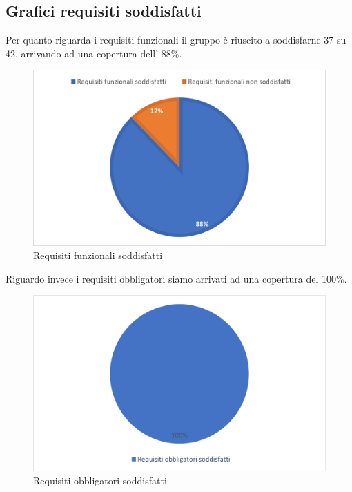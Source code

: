 \subsection{Grafici requisiti soddisfatti}
Per quanto riguarda i requisiti funzionali il gruppo \groupName{} è riuscito a soddisfarne 37 su 42, arrivando ad una copertura dell' 88\%.
\begin{figure}[htbp]
    \begin{center}
     \includegraphics{immagini/requisitiFunzionali.png}
     \caption{Requisiti funzionali soddisfatti}
    \end{center}
 \end{figure}    
 

Riguardo invece i requisiti obbligatori siamo arrivati ad una copertura del 100\%.
\begin{figure}[htbp]
   \begin{center}
    \includegraphics{immagini/requisiti_obbligatori.png}
    \caption{Requisiti obbligatori soddisfatti}
   \end{center}
\end{figure}    

